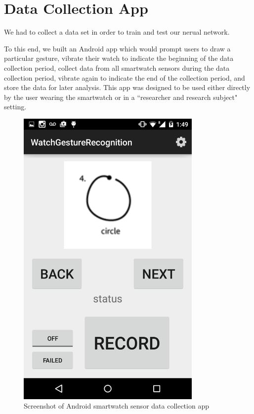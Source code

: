 \documentclass{report}
\begin{document}
\section{Data Collection App}

We had to collect a data set in order to train and test our nerual network.


To this end, we built an Android app which would prompt users to draw a particular gesture, vibrate their watch to indicate the beginning of the data collection period, collect data from all smartwatch sensors during the data collection period, vibrate again to indicate the end of the collection period, and store the data for later analysis. This app was designed to be used either directly by the user wearing the smartwatch or in a ``researcher and research subject" setting.


\begin{figure}[ht!]
  \label{app}
  \centering
  \includegraphics[width=90mm]{app}
  \caption{Screenshot of Android smartwatch sensor data collection app}
\end{figure}
\end{document}
